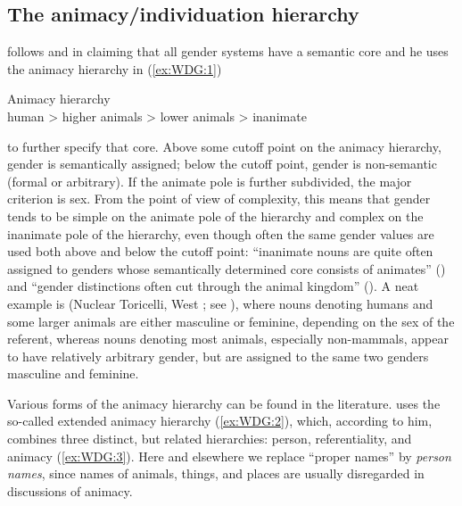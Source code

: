 \documentclass[output=collectionpaper]{langsci/langscibook}
\begin{document}
  \subsection{The animacy/individuation hierarchy}
\label{sec:WDG:3.2}

\cite{Dahl2000a} follows \cite{Aksenov1984} and \cite{Corbett1991} in claiming that all gender systems have a semantic core and he uses the animacy hierarchy in (\ref{ex:WDG:1})

\ea\label{ex:WDG:1}
Animacy hierarchy\\
human > higher animals > lower animals > inanimate\\
\z

\noindent to further specify that core. Above some cutoff point on the animacy hierarchy, gender is semantically assigned; below the cutoff point, gender is non-semantic (formal or arbitrary). If the animate pole is further subdivided, the major criterion is sex. From the point of view of complexity, this means that gender tends to be simple on the animate pole of the hierarchy and complex on the inanimate pole of the hierarchy, even though often the same gender values are used both above and below the cutoff point: ``inanimate nouns are quite often assigned to genders whose semantically determined core consists of animates'' (\citealt[102--103]{Dahl2000a}) and ``gender distinctions often cut through the animal kingdom'' (\citealt[100]{Dahl2000a}). A neat example is  (Nuclear Toricelli, West ; see ), where nouns denoting humans and some larger animals are either masculine or feminine, depending on the sex of the referent, whereas nouns denoting most animals, especially non-mammals, appear to have relatively arbitrary gender, but are assigned to the same two genders masculine and feminine.

Various forms of the animacy hierarchy can be found in the literature. \cite[130]{Croft2003} uses the so-called extended animacy hierarchy (\ref{ex:WDG:2}), which, according to him, combines three distinct, but related hierarchies: person, referentiality, and animacy (\ref{ex:WDG:3}). Here and elsewhere we replace ``proper names'' by \emph{person names}, since names of animals, things, and places are usually disregarded in discussions of animacy.

%
\end{document}
